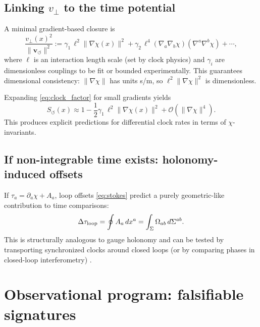 \documentclass[11pt]{article}
\newcommand{\vswirl}{\mathbf{v}_{\!\boldsymbol{\circlearrowleft}}} %
\newcommand{\vnorm}{\lVert \vswirl \rVert}
\newcommand{\Omab}{\Omega_{ab}}
\newcommand{\tua}{\tau_a}
\begin{document}
    \subsection{Linking $v_\perp$ to the time potential}
        A minimal gradient-based closure is
        \begin{equation}
            \frac{v_\perp(x)^2}{\vnorm^2} := \gamma_1\,\ell^2 \|\nabla\chi(x)\|^2 + \gamma_2\,\ell^4 (\nabla_a\nabla_b\chi)(\nabla^a\nabla^b\chi)+\cdots,
            \label{eq:vperp_closure}
        \end{equation}
        where $\ell$ is an interaction length scale (set by clock physics) and $\gamma_i$ are dimensionless couplings to be fit or bounded experimentally. This guarantees dimensional consistency: $\|\nabla\chi\|$ has units s/m, so $\ell^2\|\nabla\chi\|^2$ is dimensionless.

        Expanding \eqref{eq:clock_factor} for small gradients yields
        \begin{equation}
            S_{\!\boldsymbol{\circlearrowleft}}(x)\approx 1-\frac{1}{2}\gamma_1\,\ell^2\|\nabla\chi(x)\|^2+\mathcal{O}(\|\nabla\chi\|^4).
            \label{eq:clock_expand}
        \end{equation}
        This produces explicit predictions for differential clock rates in terms of $\chi$-invariants.

    \subsection{If non-integrable time exists: holonomy-induced offsets}
        If $\tua=\partial_a\chi + A_a$, loop offsets \eqref{eq:stokes} predict a purely geometric-like contribution to time comparisons:
        \begin{equation}
            \Delta\tau_{\rm loop}=\oint A_a\,dx^a = \int_{\Sigma}\Omab\,d\Sigma^{ab}.
            \label{eq:holonomy_clock}
        \end{equation}
        This is structurally analogous to gauge holonomy and can be tested by transporting synchronized clocks around closed loops (or by comparing phases in closed-loop interferometry) \cite{AharonovBohm1959_AB,Nakahara2003_Geometry}.

    \section{Observational program: falsifiable signatures}
\end{document}
